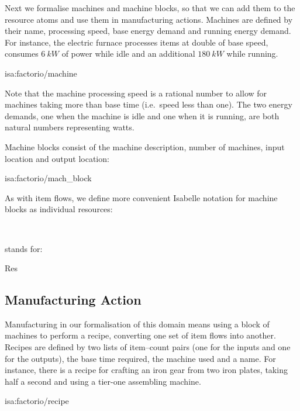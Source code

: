 \documentclass[class=smolathesis,crop=false]{standalone}
\begin{document}
Next we formalise machines and machine blocks, so that we can add them to the resource atoms and use them in manufacturing actions.
Machines are defined by their name, processing speed, base energy demand and running energy demand.
For instance, the electric furnace processes items at double of base speed, consumes $6\ kW$ of power while idle and an additional $180\ kW$ while running.
\begin{isadef}{isa:factorio/machine}
  
\item
  
\end{isadef}
\noindent
Note that the machine processing speed is a rational number to allow for machines taking more than base time (i.e.\ speed less than one).
The two energy demands, one when the machine is idle and one when it is running, are both natural numbers representing watts.

Machine blocks consist of the machine description, number of machines, input location and output location:
\pagebreak
\begin{isadef}{isa:factorio/mach_block}
  
\end{isadef}

As with item flows, we define more convenient Isabelle notation for machine blocks as individual resources:
\begin{isabelle}
\centering
  \isasymlangle{}\isasymrangle\ \ \ \isanotation{\isasymrightarrow}\ 
\end{isabelle}
stands for:
\begin{isabelle}
\centering
  Res\ 
\end{isabelle}

\subsection{Manufacturing Action}
\label{sec:cases/factorio/manufacturing}

Manufacturing in our formalisation of this domain means using a block of machines to perform a recipe, converting one set of item flows into another.
Recipes are defined by two lists of item--count pairs (one for the inputs and one for the outputs), the base time required, the machine used and a name.
For instance, there is a recipe for crafting an iron gear from two iron plates, taking half a second and using a tier-one assembling machine.
\begin{isadef}{isa:factorio/recipe}
  
\item
  
\end{isadef}
\end{document}
